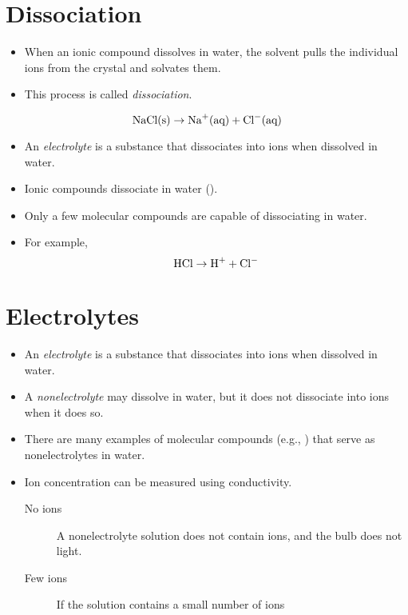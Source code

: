 \documentclass{chem122notes}
\begin{document}
\section{Dissociation}\label{sec:dissociation}
\begin{itemize}
	\item When an ionic compound dissolves in water, the solvent pulls the individual ions from the crystal and solvates them.
	\item This process is called \emph{dissociation}.
\end{itemize}
\[ \element{Na}\element{Cl} (\mbox{s}) \rightarrow \element{Na}^{+} (\mbox{aq}) + \element{Cl}^{-}(\mbox{aq}) \]
\begin{itemize}
	\item An \emph{electrolyte} is a substance that dissociates into ions when dissolved in water.
	\item Ionic compounds dissociate in water ().
	\item Only a few molecular compounds are capable of dissociating in water.
	\item For example, \[ \chemical{H}\chemical{Cl} \rightarrow \chemical{H}^{+} + \chemical{Cl}^{-} \]
\end{itemize}

\section{Electrolytes}\label{sec:electrolytes}
\begin{itemize}
	\item An \emph{electrolyte} is a substance that dissociates into ions when dissolved in water.
	\item A \emph{nonelectrolyte} may dissolve in water, but it does not dissociate into ions when it does so.
	\item There are many examples of molecular compounds (e.g., ) that serve as nonelectrolytes in water.
\end{itemize}

\begin{itemize}
	\item Ion concentration can be measured using conductivity.
	\begin{description}
		\item[No ions] A nonelectrolyte solution does not contain ions, and the bulb does not light.
		\item[Few ions] If the solution contains a small number of ions
	\end{description}
\end{itemize}
\end{document}
